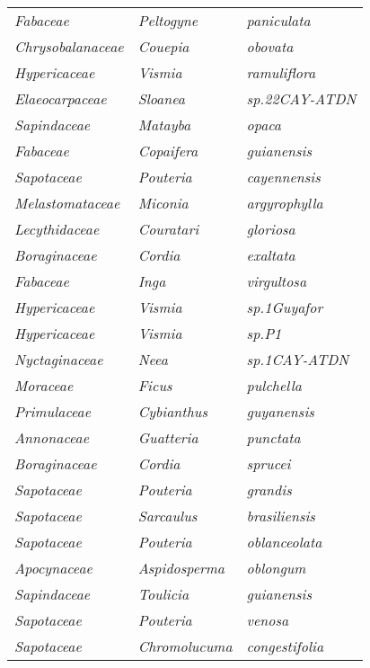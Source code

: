 \documentclass[fleqn,10pt]{ArtEcoFoG} %
\renewenvironment{table}{\begin{table*}}{\end{table*}\ignorespacesafterend}
\begin{document}
\begin{table}
\begin{tabular}[t]{lll}
\em{Fabaceae} & \em{Peltogyne} & \em{paniculata}\\
\em{Chrysobalanaceae} & \em{Couepia} & \em{obovata}\\
\addlinespace
\em{Hypericaceae} & \em{Vismia} & \em{ramuliflora}\\
\em{Elaeocarpaceae} & \em{Sloanea} & \em{sp.22CAY-ATDN}\\
\em{Sapindaceae} & \em{Matayba} & \em{opaca}\\
\em{Fabaceae} & \em{Copaifera} & \em{guianensis}\\
\em{Sapotaceae} & \em{Pouteria} & \em{cayennensis}\\
\addlinespace
\em{Melastomataceae} & \em{Miconia} & \em{argyrophylla}\\
\em{Lecythidaceae} & \em{Couratari} & \em{gloriosa}\\
\em{Boraginaceae} & \em{Cordia} & \em{exaltata}\\
\em{Fabaceae} & \em{Inga} & \em{virgultosa}\\
\em{Hypericaceae} & \em{Vismia} & \em{sp.1Guyafor}\\
\addlinespace
\em{Hypericaceae} & \em{Vismia} & \em{sp.P1}\\
\em{Nyctaginaceae} & \em{Neea} & \em{sp.1CAY-ATDN}\\
\em{Moraceae} & \em{Ficus} & \em{pulchella}\\
\em{Primulaceae} & \em{Cybianthus} & \em{guyanensis}\\
\em{Annonaceae} & \em{Guatteria} & \em{punctata}\\
\addlinespace
\em{Boraginaceae} & \em{Cordia} & \em{sprucei}\\
\em{Sapotaceae} & \em{Pouteria} & \em{grandis}\\
\em{Sapotaceae} & \em{Sarcaulus} & \em{brasiliensis}\\
\em{Sapotaceae} & \em{Pouteria} & \em{oblanceolata}\\
\em{Apocynaceae} & \em{Aspidosperma} & \em{oblongum}\\
\addlinespace
\em{Sapindaceae} & \em{Toulicia} & \em{guianensis}\\
\em{Sapotaceae} & \em{Pouteria} & \em{venosa}\\
\em{Sapotaceae} & \em{Chromolucuma} & \em{congestifolia}\\
\bottomrule
\end{tabular}
\end{table}



\makeatletter

\makeatother


\end{document}
